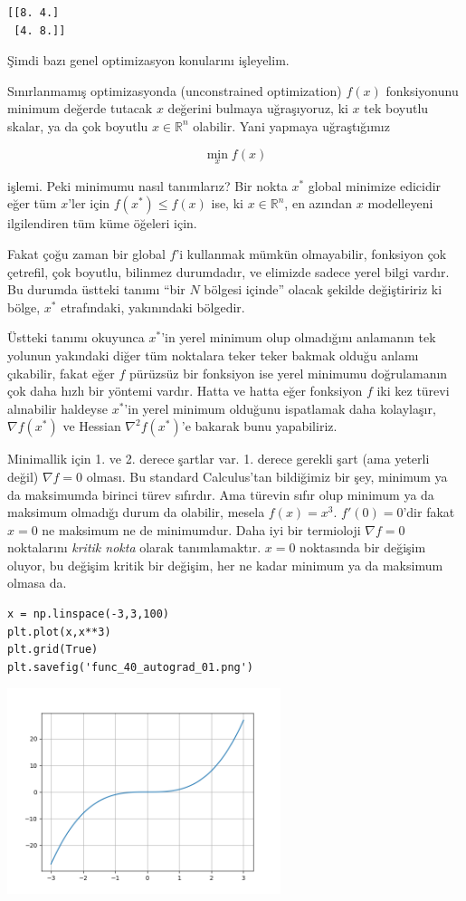 \documentclass[12pt,fleqn]{article}\usepackage{../../common}
\begin{document}
\begin{verbatim}
[[8. 4.]
 [4. 8.]]
\end{verbatim}

Şimdi bazı genel optimizasyon konularını işleyelim. 

Sınırlanmamış optimizasyonda (unconstrained optimization) $f(x)$
fonksiyonunu minimum değerde tutacak $x$ değerini bulmaya uğraşıyoruz, ki
$x$ tek boyutlu skalar, ya da çok boyutlu $x \in \mathbb{R}^n$
olabilir. Yani yapmaya uğraştığımız

$$
\min_x f(x)
$$

işlemi. Peki minimumu nasıl tanımlarız? Bir nokta $x^*$ global minimize
edicidir eğer tüm $x$'ler için $f(x^*) \le f(x)$ ise, ki
$x \in \mathbb{R}^n$, en azından $x$ modelleyeni ilgilendiren tüm küme
öğeleri için.

Fakat çoğu zaman bir global $f$'i kullanmak mümkün olmayabilir, fonksiyon
çok çetrefil, çok boyutlu, bilinmez durumdadır, ve elimizde sadece yerel
bilgi vardır. Bu durumda üstteki tanımı ``bir $N$ bölgesi içinde'' olacak
şekilde değiştiririz ki bölge, $x^*$ etrafındaki, yakınındaki bölgedir.

Üstteki tanımı okuyunca  $x^*$'in yerel minimum olup olmadığını anlamanın
tek yolunun yakındaki diğer tüm noktalara teker teker bakmak olduğu anlamı
çıkabilir, fakat eğer $f$ pürüzsüz bir fonksiyon ise yerel minimumu
doğrulamanın çok daha hızlı bir yöntemi vardır. Hatta ve hatta eğer
fonksiyon $f$ iki kez türevi alınabilir haldeyse $x^*$'in yerel minimum
olduğunu ispatlamak daha kolaylaşır, $\nabla f(x^*)$ ve Hessian $\nabla^2
f(x^*)$'e bakarak bunu yapabiliriz.

Minimallik için 1. ve 2. derece şartlar var. 1. derece gerekli şart (ama
yeterli değil) $\nabla f = 0$ olması. Bu standard Calculus'tan bildiğimiz
bir şey, minimum ya da maksimumda birinci türev sıfırdır. Ama türevin sıfır
olup minimum ya da maksimum olmadığı durum da olabilir, mesela
$f(x) = x^3$. $f'(0) = 0$'dir fakat $x=0$ ne maksimum ne de
minimumdur. Daha iyi bir termioloji $\nabla f = 0$ noktalarını {\em kritik
  nokta} olarak tanımlamaktır. $x=0$ noktasında bir değişim oluyor, bu
değişim kritik bir değişim, her ne kadar minimum ya da maksimum olmasa da.

\begin{verbatim}
x = np.linspace(-3,3,100)
plt.plot(x,x**3)
plt.grid(True)
plt.savefig('func_40_autograd_01.png')
\end{verbatim}

\includegraphics[height=6cm]{func_40_autograd_01.png}
\end{document}

